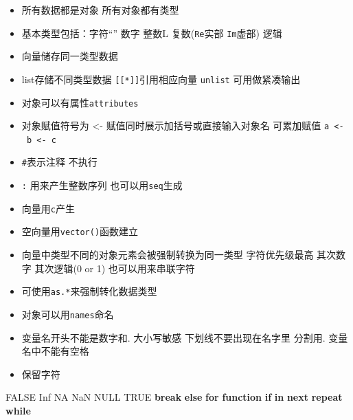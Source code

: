 \documentclass[
]{book}
\newenvironment{Shaded}{\begin{snugshade}}{\end{snugshade}}
\newcommand{\ControlFlowTok}[1]{\textcolor[rgb]{0.13,0.29,0.53}{\textbf{#1}}}
\newcommand{\OtherTok}[1]{\textcolor[rgb]{0.56,0.35,0.01}{#1}}
\providecommand{\tightlist}{%
  \setlength{\itemsep}{0pt}\setlength{\parskip}{0pt}}
\begin{document}
\begin{itemize}
\tightlist
\item
  所有数据都是对象 所有对象都有类型
\item
  基本类型包括：字符``'' 数字 整数L 复数(\texttt{Re}实部 \texttt{Im}虚部) 逻辑
\item
  向量储存同一类型数据
\item
  list存储不同类型数据 \texttt{{[}{[}*{]}{]}}引用相应向量 \texttt{unlist} 可用做紧凑输出
\item
  对象可以有属性\texttt{attributes}
\item
  对象赋值符号为 \textless- 赋值同时展示加括号或直接输入对象名 可累加赋值 \texttt{a\ \textless{}-\ b\ \textless{}-\ c}
\item
  \texttt{\#}表示注释 不执行
\item
  \texttt{:} 用来产生整数序列 也可以用\texttt{seq}生成
\item
  向量用\texttt{c}产生
\item
  空向量用\texttt{vector()}函数建立
\item
  向量中类型不同的对象元素会被强制转换为同一类型 字符优先级最高 其次数字 其次逻辑(0 or 1) 也可以用来串联字符
\item
  可使用\texttt{as.*}来强制转化数据类型
\item
  对象可以用\texttt{names}命名
\item
  变量名开头不能是数字和. 大小写敏感 下划线不要出现在名字里 分割用. 变量名中不能有空格
\item
  保留字符
\end{itemize}

\begin{Shaded}
\begin{Highlighting}[]
\OtherTok{FALSE} \OtherTok{Inf} \OtherTok{NA} \OtherTok{NaN} \OtherTok{NULL} \OtherTok{TRUE} \ControlFlowTok{break} \ControlFlowTok{else} \ControlFlowTok{for} \ControlFlowTok{function} \ControlFlowTok{if} \ControlFlowTok{in} \ControlFlowTok{next} \ControlFlowTok{repeat} \ControlFlowTok{while}
\end{Highlighting}
\end{Shaded}
\end{document}
